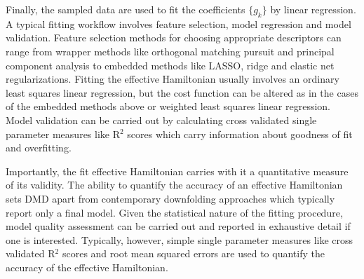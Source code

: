 \documentclass[12pt]{article}
\begin{document}
Finally, the sampled data are used to fit the coefficients $\{g_k\}$ by linear regression.
A typical fitting workflow involves feature selection, model regression and model validation.
Feature selection methods for choosing appropriate descriptors can range from wrapper methods like orthogonal matching pursuit and principal component analysis to embedded methods like LASSO, ridge and elastic net regularizations. 
Fitting the effective Hamiltonian usually involves an ordinary least squares linear regression, but the cost function can be altered as in the cases of the embedded methods above or weighted least squares linear regression.
Model validation can be carried out by calculating cross validated single parameter measures like R$^2$ scores which carry information about goodness of fit and overfitting.

Importantly, the fit effective Hamiltonian carries with it a quantitative measure of its validity.
The ability to quantify the accuracy of an effective Hamiltonian sets DMD apart from contemporary downfolding approaches which typically report only a final model.
Given the statistical nature of the fitting procedure, model quality assessment can be carried out and reported in exhaustive detail if one is interested.
Typically, however, simple single parameter measures like cross validated R$^2$ scores and root mean squared errors are used to quantify the accuracy of the effective Hamiltonian.
\end{document}
